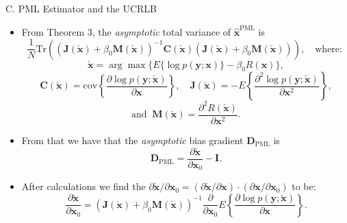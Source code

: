 \documentclass{beamer}
\begin{document}
\begin{frame}{C. PML Estimator and the UCRLB}
\begin{itemize}
    \item From Theorem 3, the \textit{asymptotic} total variance of $ \mathbf{\hat{x}}^{\text{PML}} $ is
    \begin{equation*}
    \frac{1}{N} \text{Tr} \left( (\mathbf{J}(\check{\mathbf{x}}) + \beta_0 \mathbf{M}(\check{\mathbf{x}}))^{-1} \mathbf{C}(\check{\mathbf{x}}) (\mathbf{J}(\check{\mathbf{x}}) + \beta_0 \mathbf{M}(\check{\mathbf{x}})) \right), \quad \text{where: }
    \end{equation*}
    \[
    \check{\mathbf{x}} = \arg\max\{E \{\log p(\mathbf{y}; \mathbf{x})\} - \beta_0 R(\mathbf{x})\},
    \]
    \[
    \mathbf{C}(\check{\mathbf{x}}) = \text{cov}\left\{\frac{\partial \log p(\mathbf{y}; \check{\mathbf{x}})}{\partial \mathbf{x}}\right\}, \quad
    \mathbf{J}(\check{\mathbf{x}}) = -E\left\{\frac{\partial^2 \log p(\mathbf{y}; \check{\mathbf{x}})}{\partial \mathbf{x}^2}\right\},
    \]
    \[
    \text{and } \ \mathbf{M}(\check{\mathbf{x}}) = \frac{\partial^2 R(\check{\mathbf{x}})}{\partial \mathbf{x}^2}.
    \]

    \item From that we have that the \textit{asymptotic} bias gradient $\mathbf{D}_{\text{PML}}$ is
    \begin{equation*}
    \mathbf{D}_{\text{PML}} = \frac{\partial \check{\mathbf{x}}}{\partial \mathbf{x}_0} - \mathbf{I}.
    \end{equation*}

    \item After calculations we find the $\partial \check{\mathbf{x}}/\partial \mathbf{x}_0 = (\partial \check{\mathbf{x}}/\partial \mathbf{x}) \cdot (\partial \mathbf{x}/\partial \mathbf{x}_0)$ to be:
    \begin{equation*}
        \frac{\partial \check{\mathbf{x}}}{\partial \mathbf{x}_0} = (\mathbf{J}(\check{\mathbf{x}}) + \beta_0 \mathbf{M}(\check{\mathbf{x}}))^{-1} \frac{\partial}{\partial \mathbf{x}_0} E \left\{ \frac{\partial \log p(\mathbf{y}; \check{\mathbf{x}})}{\partial \mathbf{x}} \right\}.
    \end{equation*}
    
\end{itemize}
\end{frame}
\end{document}
